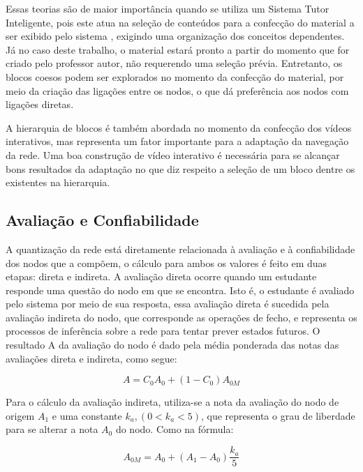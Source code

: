 Essas teorias são de maior importância quando se utiliza um Sistema Tutor Inteligente, pois este atua na seleção de conteúdos para a confecção do material a ser exibido pelo sistema \cite{fragelli2010}, exigindo uma organização dos conceitos dependentes. Já no caso deste trabalho, o material estará pronto a partir do momento que for criado pelo professor autor, não requerendo uma seleção prévia. Entretanto, os blocos coesos podem ser explorados no momento da confecção do material, por meio da criação das ligações entre os nodos, o que dá preferência aos nodos com ligações diretas.

A hierarquia de blocos é também abordada no momento da confecção dos vídeos interativos, mas representa um fator importante para a adaptação da navegação da rede. Uma boa construção de vídeo interativo é necessária para se alcançar bons resultados da adaptação no que diz respeito a seleção de um bloco dentre os existentes na hierarquia.

\subsection{Avaliação e Confiabilidade}

A quantização da rede está diretamente relacionada à avaliação e à confiabilidade dos nodos que a compõem, o cálculo para ambos os valores é feito em duas etapas: direta e indireta. A avaliação direta ocorre quando um estudante responde uma questão do nodo em que se encontra. Isto é, o estudante é avaliado pelo sistema por meio de sua resposta, essa avaliação direta é sucedida pela avaliação indireta do nodo, que corresponde as operações de fecho, e representa os processos de inferência sobre a rede para tentar prever estados futuros. O resultado A da avaliação do nodo é dado pela média ponderada das notas das avaliações direta e indireta, como segue:

\begin{equation}
	A = C_{0}A_{0} + (1 - C_{0})A_{0M}
\end{equation}

Para o cálculo da avaliação indireta, utiliza-se a nota da avaliação do nodo de origem \(A_{1}\) e uma constante \( k_{a},(0 < k_{a} < 5) \), que representa o grau de liberdade para se alterar a nota \(A_{0}\) do nodo. Como na fórmula:

\begin{equation}
	A_{0M} =  A_{0} + (A_{1} - A_{0})\frac{k_{a}}{5}
\end{equation}

